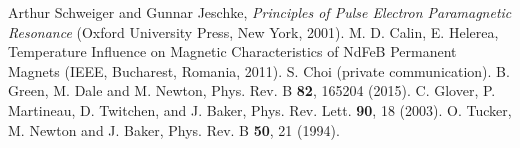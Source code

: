 \documentclass[%
 reprint,
 amsmath,amssymb,
 aps,
]{revtex4-1}
\begin{document}
\begin{thebibliography}{9}
 Arthur Schweiger and Gunnar Jeschke, \textit{Principles of Pulse Electron Paramagnetic Resonance} (Oxford University Press, New York, 2001).
 M. D. Calin, E. Helerea, Temperature Influence on Magnetic
Characteristics of NdFeB Permanent Magnets (IEEE, Bucharest, Romania, 2011).
 S. Choi (private communication).
 B. Green, M. Dale and M. Newton, Phys. Rev. B \textbf{82}, 165204 (2015).
 C. Glover, P. Martineau, D. Twitchen, and J. Baker, Phys. Rev. Lett. \textbf{90}, 18 (2003). 
 O. Tucker, M. Newton and J. Baker, Phys. Rev. B \textbf{50}, 21 (1994).
\end{thebibliography}
\end{document}
